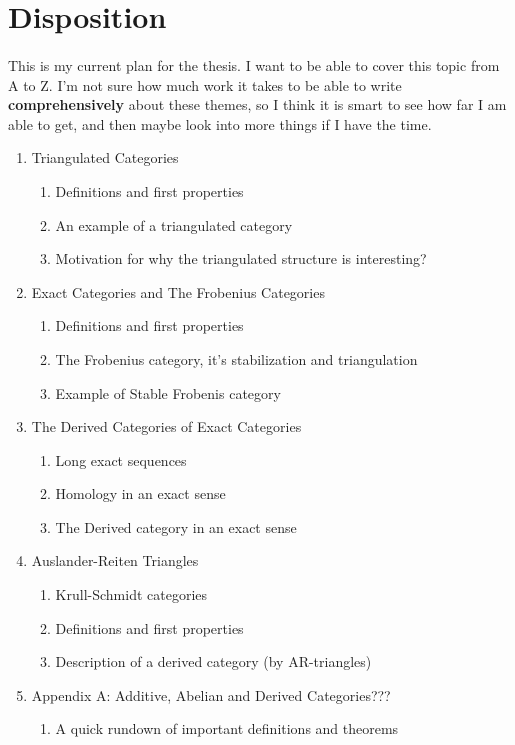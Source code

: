 \documentclass[12pt]{article}
\begin{document}
    
    \section*{Disposition}
    
    \paragraph*{}
    This is my current plan for the thesis. I want to be able to cover this topic from A to Z. I'm not sure how much work it takes to be able to write \textbf{comprehensively} about these themes, so I think it is smart to see how far I am able to get, and then maybe look into more things if I have the time.
    \begin{enumerate}
        \item Triangulated Categories \begin{enumerate}
            \item Definitions and first properties
            \item An example of a triangulated category
            \item Motivation for why the triangulated structure is interesting?
        \end{enumerate}
        \item Exact Categories and The Frobenius Categories \begin{enumerate}
            \item Definitions and first properties
            \item The Frobenius category, it's stabilization and triangulation
            \item Example of Stable Frobenis category
        \end{enumerate}
        \item The Derived Categories of Exact Categories \begin{enumerate}
            \item Long exact sequences
            \item Homology in an exact sense
            \item The Derived category in an exact sense
        \end{enumerate}
        \item Auslander-Reiten Triangles \begin{enumerate}
            \item Krull-Schmidt categories
            \item Definitions and first properties
            \item Description of a derived category (by AR-triangles)
        \end{enumerate}
        \item Appendix A: Additive, Abelian and Derived Categories??? \begin{enumerate}
            \item A quick rundown of important definitions and theorems
        \end{enumerate}
    \end{enumerate}
\end{document}
